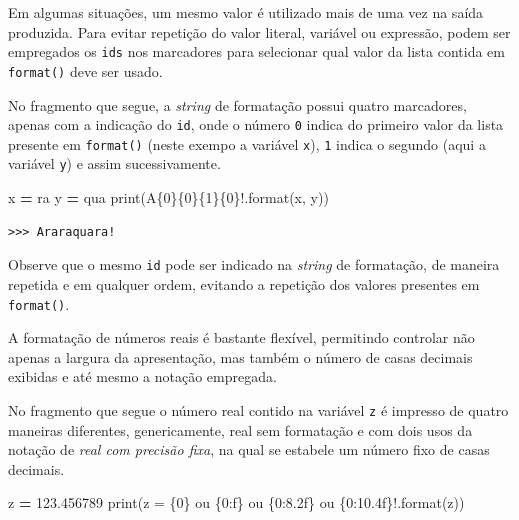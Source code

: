 \documentclass[
]{book}
\newenvironment{Shaded}{\begin{snugshade}}{\end{snugshade}}
\newcommand{\BuiltInTok}[1]{#1}
\newcommand{\FloatTok}[1]{\textcolor[rgb]{0.00,0.00,0.81}{#1}}
\newcommand{\NormalTok}[1]{#1}
\newcommand{\OperatorTok}[1]{\textcolor[rgb]{0.81,0.36,0.00}{\textbf{#1}}}
\newcommand{\SpecialCharTok}[1]{\textcolor[rgb]{0.00,0.00,0.00}{#1}}
\newcommand{\StringTok}[1]{\textcolor[rgb]{0.31,0.60,0.02}{#1}}
\begin{document}
Em algumas situações, um mesmo valor é utilizado mais de uma vez na saída produzida. Para evitar repetição do valor literal, variável ou expressão, podem ser empregados os \texttt{ids} nos marcadores para selecionar qual valor da lista contida em \texttt{format()} deve ser usado.

No fragmento que segue, a \emph{string} de formatação possui quatro marcadores, apenas com a indicação do \texttt{id}, onde o número \texttt{0} indica do primeiro valor da lista presente em \texttt{format()} (neste exempo a variável \texttt{x}), \texttt{1} indica o segundo (aqui a variável \texttt{y}) e assim sucessivamente.

\begin{Shaded}
\begin{Highlighting}[]
\NormalTok{x }\OperatorTok{=} \StringTok{\textquotesingle{}ra\textquotesingle{}}
\NormalTok{y }\OperatorTok{=} \StringTok{\textquotesingle{}qua\textquotesingle{}}
\BuiltInTok{print}\NormalTok{(}\StringTok{\textquotesingle{}A}\SpecialCharTok{\{0\}\{0\}\{1\}\{0\}}\StringTok{!\textquotesingle{}}\NormalTok{.}\BuiltInTok{format}\NormalTok{(x, y))}
\end{Highlighting}
\end{Shaded}

\begin{verbatim}
>>> Araraquara!
\end{verbatim}

Observe que o mesmo \texttt{id} pode ser indicado na \emph{string} de formatação, de maneira repetida e em qualquer ordem, evitando a repetição dos valores presentes em \texttt{format()}.

A formatação de números reais é bastante flexível, permitindo controlar não apenas a largura da apresentação, mas também o número de casas decimais exibidas e até mesmo a notação empregada.

No fragmento que segue o número real contido na variável \texttt{z} é impresso de quatro maneiras diferentes, genericamente, real sem formatação e com dois usos da notação de \emph{real com precisão fixa}, na qual se estabele um número fixo de casas decimais.

\begin{Shaded}
\begin{Highlighting}[]
\NormalTok{z }\OperatorTok{=} \FloatTok{123.456789}
\BuiltInTok{print}\NormalTok{(}\StringTok{\textquotesingle{}z = }\SpecialCharTok{\{0\}}\StringTok{ ou }\SpecialCharTok{\{0:f\}}\StringTok{ ou }\SpecialCharTok{\{0:8.2f\}}\StringTok{ ou }\SpecialCharTok{\{0:10.4f\}}\StringTok{!\textquotesingle{}}\NormalTok{.}\BuiltInTok{format}\NormalTok{(z))}
\end{Highlighting}
\end{Shaded}
\end{document}
